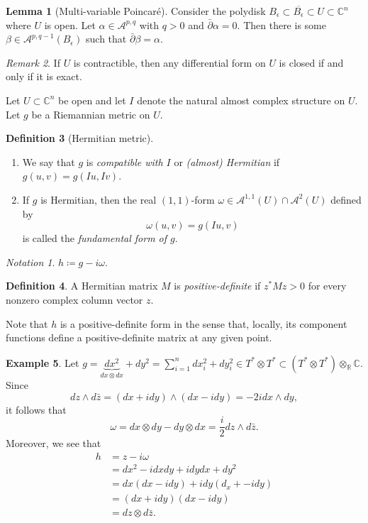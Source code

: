 \documentclass[10pt,letterpaper,cm]{nupset}
\theoremstyle{definition}
\newtheorem{defn}{Definition}[subsection]
\newtheorem{exmp}[defn]{Example}
\theoremstyle{theorem}
\newtheorem{lemma}[defn]{Lemma}
\theoremstyle{remark}
\newtheorem{remark}[defn]{Remark}
\newtheorem*{notation}{Notation}
\newcommand{\A}{\mathcal A}
\newcommand{\C}{\mathbb C}
\newcommand{\R}{\mathbb{R}}
\newcommand{\1}{\mathbb{1}}
\newcommand{\0}{\vec 0}
\newcommand{\be}{\begin{enumerate}}
\newcommand{\ee}{\end{enumerate}}
\begin{document}
\begin{lemma}[Multi-variable Poincar\'e]
Consider the polydisk $B_{\epsilon} \subset \overline{B_{\epsilon}} \subset U \subset \C^n$  where $U$ is open. Let $\alpha \in \A^{p,q}$ with $q>0$ and $\bar{\partial}{\alpha} =0$. Then there is some $\beta \in \A^{p, q-1}\left(B_{\epsilon}\right)$ such that $\bar{\partial}{\beta} = \alpha$.
\end{lemma}

\begin{remark}
If $U$ is contractible, then any differential form on $U$ is closed if and only if it is exact.
\end{remark}

Let $U \subset \C^n$ be open and let $I$ denote the natural almost complex structure on $U$. Let $g$ be a Riemannian metric on $U$.

\begin{defn}[Hermitian metric] $ $
\be
\item  We say that $g$ is \textit{compatible with $I$} or \textit{(almost) Hermitian} if $g\left(u,v\right) = g\left(I{u}, I{v}\right)$.
\item If $g$ is Hermitian, then the real $\left(1,1\right)$-form $\omega \in \A^{1,1}\left(U\right) \cap \A^2\left(U\right)$ defined by $$\omega\left(u,v\right) = g \left(I{u}, v\right)$$ is called the \textit{fundamental form of $g$}.
\ee
\end{defn}

\begin{notation}
$h \coloneqq g -i{\omega}$.
\end{notation}

\begin{defn}
A Hermitian matrix $M$ is \textit{positive-definite} if $z^{\ast}Mz >0$ for every nonzero complex column vector $z$.
\end{defn}

Note that $h$ is a positive-definite form in the sense that, locally, its component functions define a positive-definite matrix at any given point. 

\begin{exmp}
Let $g = \underbrace{d{x^2}}_{d{x}\otimes d{x}} + d{y^2} = \sum_{i=1}^nd{x_i^2} + d{y_i^2} \in T^{\ast}\otimes T^{\ast} \subset \left(T^{\ast}\otimes T^{\ast}\right)\otimes_{\R}\C$. Since
\[
d{z} \wedge d{\bar{z}} = \left(d{x} + id{y}\right) \wedge \left(d{x}- id{y}\right) = {-2id{x}}\wedge d{y}
,\]
it follows that
\[
\omega = d{x}\otimes d{y} -d{y}\otimes d{x} = \frac{i}{2}d{z} \wedge d{\bar{z}}
.\] Moreover, we see that
\begin{align*}
h & = z-i{\omega}
\\ & = d{x^2} -id{x}d{y} +id{y}d{x} +d{y}^2
\\ & = d{x}\left(d{x}-id{y}\right) + id{y}\left(d_x+-id{y}\right)
\\ & = \left(d{x} + id{y}\right)\left(d{x}-id{y}\right) 
\\ & = d{z}\otimes d{\bar{z}}.
\end{align*}
\end{exmp}
\end{document}
